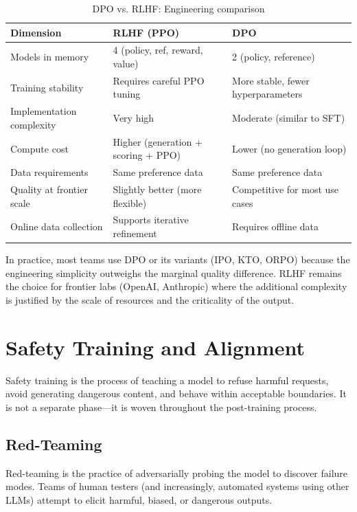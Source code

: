 \begin{table}[htbp]
\centering
\caption{DPO vs. RLHF: Engineering comparison}
\label{tab:dpo-vs-rlhf}
\begin{tabularx}{\textwidth}{lXX}
\toprule
\textbf{Dimension} & \textbf{RLHF (PPO)} & \textbf{DPO} \\
\midrule
Models in memory & 4 (policy, ref, reward, value) & 2 (policy, reference) \\
Training stability & Requires careful PPO tuning & More stable, fewer hyperparameters \\
Implementation complexity & Very high & Moderate (similar to SFT) \\
Compute cost & Higher (generation + scoring + PPO) & Lower (no generation loop) \\
Data requirements & Same preference data & Same preference data \\
Quality at frontier scale & Slightly better (more flexible) & Competitive for most use cases \\
Online data collection & Supports iterative refinement & Requires offline data \\
\bottomrule
\end{tabularx}
\end{table}

In practice, most teams use DPO or its variants (IPO, KTO, ORPO) because the engineering simplicity outweighs the marginal quality difference. RLHF remains the choice for frontier labs (OpenAI, Anthropic) where the additional complexity is justified by the scale of resources and the criticality of the output.

\section{Safety Training and Alignment}
\label{sec:safety}

Safety training is the process of teaching a model to refuse harmful requests, avoid generating dangerous content, and behave within acceptable boundaries. It is not a separate phase---it is woven throughout the post-training process.

\subsection{Red-Teaming}

Red-teaming is the practice of adversarially probing the model to discover failure modes. Teams of human testers (and increasingly, automated systems using other LLMs) attempt to elicit harmful, biased, or dangerous outputs.

